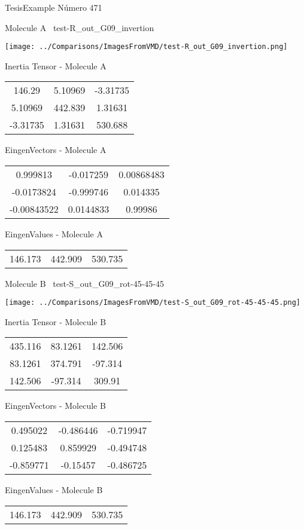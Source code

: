 \vtab[-3cm]
\begin{center}
{\large TesisExample \tab Número 471}
\end{center}
\begin{multicols}{2}
\begin{center}

Molecule A \
test-R\_out\_G09\_invertion

\texttt{[image: ../Comparisons/ImagesFromVMD/test-R\_out\_G09\_invertion.png]}

Inertia Tensor - Molecule A \\
\begin{tabular}{|c c c|}
146.29	 & 	5.10969	 & 	-3.31735	 \\
5.10969	 & 	442.839	 & 	1.31631	 \\
-3.31735	 & 	1.31631	 & 	530.688
\end{tabular}

\vtab
 EingenVectors - Molecule A     \\
\begin{tabular}{|c c c|}
0.999813	 & 	-0.017259	 & 	0.00868483	 \\
-0.0173824	 & 	-0.999746	 & 	0.014335	 \\
-0.00843522	 & 	0.0144833	 & 	0.99986
\end{tabular}

\vtab
 EingenValues - Molecule A     \\
\begin{tabular}{|c c c|}
146.173	 & 	442.909	 & 	530.735	 \\
\end{tabular}
\columnbreak

Molecule B \
test-S\_out\_G09\_rot-45-45-45

\texttt{[image: ../Comparisons/ImagesFromVMD/test-S\_out\_G09\_rot-45-45-45.png]}

Inertia Tensor - Molecule B \\
\begin{tabular}{|c c c|}
435.116	 & 	83.1261	 & 	142.506	 \\
83.1261	 & 	374.791	 & 	-97.314	 \\
142.506	 & 	-97.314	 & 	309.91
\end{tabular}

\vtab
 EingenVectors - Molecule B     \\
\begin{tabular}{|c c c|}
0.495022	 & 	-0.486446	 & 	-0.719947	 \\
0.125483	 & 	0.859929	 & 	-0.494748	 \\
-0.859771	 & 	-0.15457	 & 	-0.486725
\end{tabular}

\vtab
 EingenValues - Molecule B     \\
\begin{tabular}{|c c c|}
146.173	 & 	442.909	 & 	530.735	 \\
\end{tabular}

\end{center}
\end{multicols}

